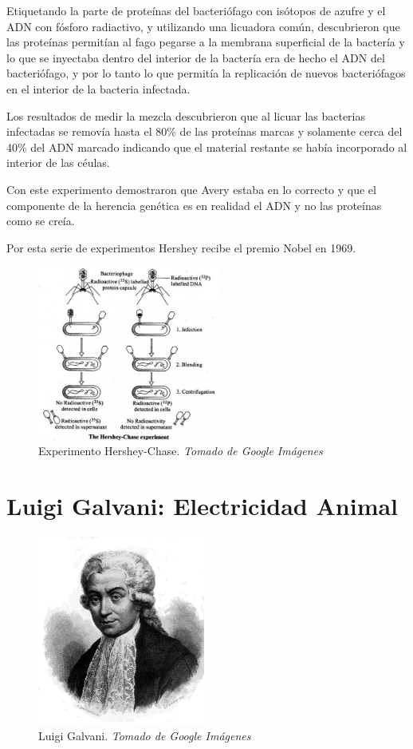 \documentclass[journal]{IEEEtran}
\begin{document}
Etiquetando la parte de proteínas  del bacteriófago con isótopos de azufre y el ADN con fósforo radiactivo, y utilizando una licuadora común, descubrieron que las proteínas permitían al fago
pegarse a la membrana superficial de la bactería y lo que se inyectaba dentro del interior de la bactería era de hecho el ADN del bacteriófago, y por lo tanto lo
que permitía la replicación de nuevos bacteriófagos en el interior de la bacteria infectada.

Los resultados de medir la mezcla descubrieron que al licuar las bacterias infectadas se removía hasta el 80\% de las proteínas marcas y solamente cerca del 40\% del ADN marcado
indicando que el material restante se había incorporado al interior de las céulas.

Con este experimento demostraron que Avery estaba en lo correcto y que el componente de la herencia genética
es en realidad el ADN y no las proteínas como se creía.

Por esta serie de experimentos Hershey recibe el premio Nobel en 1969.\cite{hernandez_2019}
\begin{center}
  \begin{figure}[h!]
  \includegraphics[width=60mm]{hershey.jpg}
  \caption{Experimento Hershey-Chase. \emph{Tomado de Google Imágenes}}
  \end{figure}
\end{center}
  

\section{Luigi Galvani: Electricidad Animal}

\begin{center}
  \begin{figure}[h!]
  \includegraphics[width=55mm]{Luigi_Galvani.jpg}
  \caption{Luigi Galvani. \emph{Tomado de Google Imágenes}}
  \end{figure}
\end{center}
\end{document}
